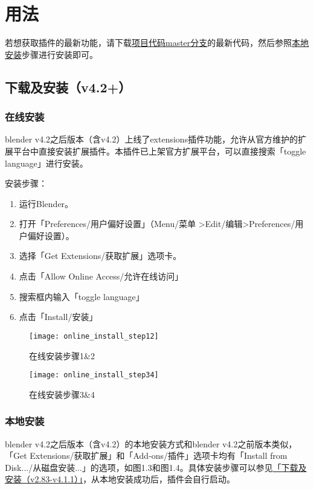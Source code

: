 \documentclass{../../public_resources/doc}
\begin{document}
\section{用法}
若想获取插件的最新功能，请下载\href{https://github.com/Mister-Kin/ToggleLanguage/archive/refs/heads/master.zip}{项目代码master分支}的最新代码，然后参照\hyperlink{local_install}{本地安装}步骤进行安装即可。

\subsection{下载及安装（v4.2+）}
\subsubsection{在线安装}
blender v4.2之后版本（含v4.2）上线了extensions插件功能，允许从官方维护的扩展平台中直接安装扩展插件。本插件已上架官方扩展平台，可以直接搜索「toggle language」进行安装。

\noindent 安装步骤：
\begin{enumerate}
    \item 运行Blender。
    \item 打开「Preferences/用户偏好设置」（Menu/菜单 >Edit/编辑>Preferences/用户偏好设置）。
    \item 选择「Get Extensions/获取扩展」选项卡。
    \item 点击「Allow Online Access/允许在线访问」
    \item 搜索框内输入「toggle language」
    \item 点击「Install/安装」
\end{enumerate}

\begin{figure}[h!]
    \begin{minipage}[t]{0.48\linewidth}
        \texttt{[image: online\_install\_step12]}
        \caption{在线安装步骤1\&2}
    \end{minipage}
    \quad
    \begin{minipage}[t]{0.48\linewidth}
        \texttt{[image: online\_install\_step34]}
        \caption{在线安装步骤3\&4}
    \end{minipage}
\end{figure}

\subsubsection{本地安装}
\hypertarget{local_install}{}
blender v4.2之后版本（含v4.2）的本地安装方式和blender v4.2之前版本类似，「Get Extensions/获取扩展」和「Add‐ons/插件」选项卡均有「Install from Disk.../从磁盘安装...」的选项，如图1.3和图1.4。具体安装步骤可以参见\hyperlink{install_v283_v411}{「下载及安装（v2.83-v4.1.1）」}，从本地安装成功后，插件会自行启动。
\end{document}
